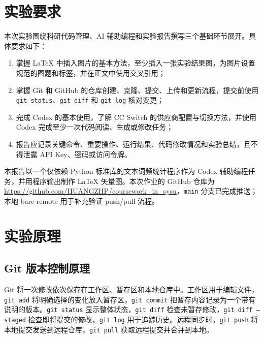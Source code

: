 \documentclass{SYSUReport}
\date{2026 年 9 月 13 日}
\begin{document}
\cover
\thispagestyle{empty}
\clearpage

\tableofcontents
\clearpage

\setcounter{page}{1}

\section{实验要求}

本次实验围绕科研代码管理、AI 辅助编程和实验报告撰写三个基础环节展开。具体要求如下：

\begin{enumerate}
    \item 掌握 LaTeX 中插入图片的基本方法，至少插入一张实验结果图，为图片设置规范的图题和标签，并在正文中使用交叉引用；
    \item 掌握 Git 和 GitHub 的仓库创建、克隆、提交、上传和更新流程，提交前使用 \texttt{git status}、\texttt{git diff} 和 \texttt{git log} 核对变更；
    \item 完成 Codex 的基本使用，了解 CC Switch 的供应商配置与切换方法，并使用 Codex 完成至少一次代码阅读、生成或修改任务；
    \item 报告应记录关键命令、重要操作、运行结果、代码修改情况和实验总结，且不得泄露 API Key、密码或访问令牌。
\end{enumerate}

本报告以一个仅依赖 Python 标准库的文本词频统计程序作为 Codex 辅助编程任务，并用程序输出制作 LaTeX 矢量图。本次作业的 GitHub 仓库为 \url{https://github.com/HUANGZHP/coursework_in_sysu}，\texttt{main} 分支已完成推送；本地 bare remote 用于补充验证 push/pull 流程。

\section{实验原理}

\subsection{Git 版本控制原理}

Git 将一次修改依次保存在工作区、暂存区和本地仓库中。工作区用于编辑文件，\texttt{git add} 将明确选择的变化放入暂存区，\texttt{git commit} 把暂存内容记录为一个带有说明的版本。\texttt{git status} 显示整体状态，\texttt{git diff} 检查未暂存修改，\texttt{git diff --staged} 检查即将提交的修改，\texttt{git log} 用于追踪历史。远程同步时，\texttt{git push} 将本地提交发送到远程仓库，\texttt{git pull} 获取远程提交并合并到本地。
\end{document}
